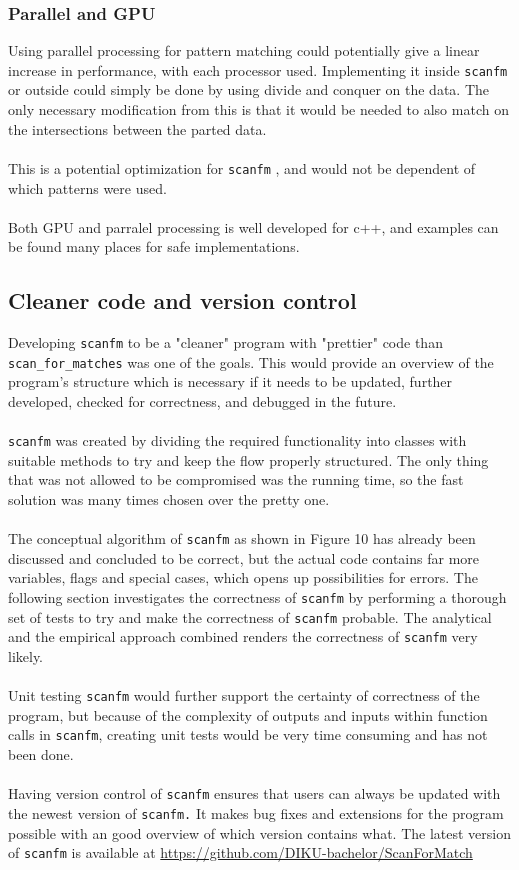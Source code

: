 \documentclass[12pt]{article}
\newcommand{\scm}{\texttt{scan\_for\_matches} }
\newcommand{\sfm}{\texttt{scanfm} }
\newcommand{\sfmp}{\texttt{scanfm.} }
\begin{document}
\subsubsection{Parallel and GPU}
Using parallel processing for pattern matching could potentially give a linear increase in performance, with each processor used.
Implementing it inside \sfm or outside could simply be done by using divide and conquer on the data.
The only necessary modification from this is that it would be needed to also match on the intersections between the parted data.\\
\\
This is a potential optimization for \sfm, and would not be dependent of which patterns were used.\\
\\
Both GPU and parralel processing is well developed for c++, and examples can be found many places for safe implementations.
\subsection{Cleaner code and version control}
Developing \sfm to be a "cleaner" program with "prettier" code than \scm was one of the goals.
This would provide an overview of the program's
structure which is necessary if it needs to be updated, further developed,
checked for correctness, and debugged in the future. \\ \\
\sfm was created by dividing the required functionality into classes with suitable methods to try and keep the flow
properly structured. The only thing that was not allowed to be compromised was the running time, 
so the fast solution was many times chosen over the pretty one. \\ \\
The conceptual algorithm of \sfm as shown in Figure 10 has already been discussed and concluded to be correct, 
but the actual code contains far more variables, flags and special cases, which opens up possibilities for errors.
The following section investigates the correctness of \sfm by performing a thorough set of tests to try
and make the correctness of \sfm probable. The analytical and the empirical approach combined renders the correctness
of \sfm very likely. \\ \\
Unit testing \sfm would further support the certainty of correctness of the program, but because
of the complexity of outputs and inputs within function calls in \texttt{scanfm}, 
creating unit tests would be very time consuming and has not been done. \\ \\
Having version control of \sfm ensures that users can always be updated with the newest version of \sfmp
It makes bug fixes and extensions for the program possible with an good overview of which version contains what.
The latest version of \sfm is available at \url{https://github.com/DIKU-bachelor/ScanForMatch}
\end{document}
